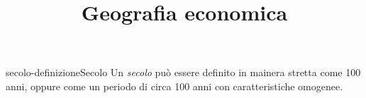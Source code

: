 \documentclass[preview]{standalone}
\begin{document}
\title{Geografia economica}
\genpage

\begin{snippetdefinition}{secolo-definizione}{Secolo}
    Un \textit{secolo} può essere definito in mainera stretta come 100 anni,
    oppure come un periodo di circa 100 anni con caratteristiche omogenee.
\end{snippetdefinition}
\end{document}
